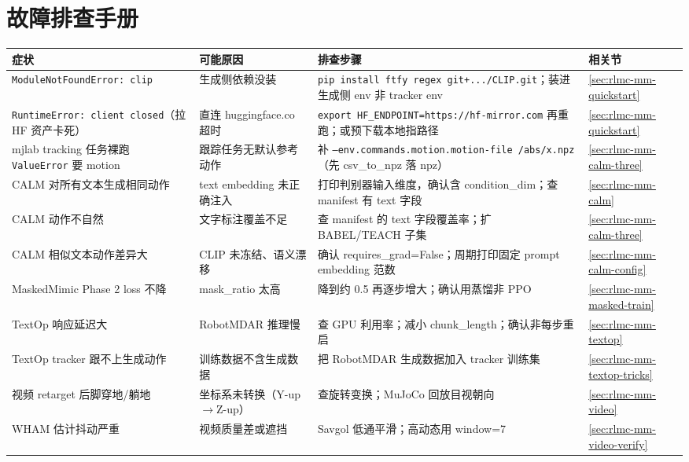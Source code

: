 \section*{故障排查手册}
\label{sec:rlmc-mm-troubleshoot}

\begin{center}
\small
\begin{tabular}{@{}p{3.4cm}p{3.0cm}p{4.4cm}l@{}}
\toprule
症状 & 可能原因 & 排查步骤 & 相关节 \\
\midrule
\texttt{ModuleNotFoundError: clip} & 生成侧依赖没装 & \texttt{pip install ftfy regex git+.../CLIP.git}；装进生成侧 env 非 tracker env & \cref{sec:rlmc-mm-quickstart} \\
\texttt{RuntimeError: client closed}（拉 HF 资产卡死） & 直连 huggingface.co 超时 & \texttt{export HF\_ENDPOINT=https://hf-mirror.com} 再重跑；或预下载本地指路径 & \cref{sec:rlmc-mm-quickstart} \\
mjlab tracking 任务裸跑 \texttt{ValueError} 要 motion & 跟踪任务无默认参考动作 & 补 \texttt{--env.commands.motion.motion-file /abs/x.npz}（先 csv\_to\_npz 落 npz） & \cref{sec:rlmc-mm-calm-three} \\
CALM 对所有文本生成相同动作 & text embedding 未正确注入 & 打印判别器输入维度，确认含 condition\_dim；查 manifest 有 text 字段 & \cref{sec:rlmc-mm-calm} \\
CALM 动作不自然 & 文字标注覆盖不足 & 查 manifest 的 text 字段覆盖率；扩 BABEL/TEACH 子集 & \cref{sec:rlmc-mm-calm-three} \\
CALM 相似文本动作差异大 & CLIP 未冻结、语义漂移 & 确认 requires\_grad=False；周期打印固定 prompt embedding 范数 & \cref{sec:rlmc-mm-calm-config} \\
MaskedMimic Phase 2 loss 不降 & mask\_ratio 太高 & 降到约 0.5 再逐步增大；确认用蒸馏非 PPO & \cref{sec:rlmc-mm-masked-train} \\
TextOp 响应延迟大 & RobotMDAR 推理慢 & 查 GPU 利用率；减小 chunk\_length；确认非每步重启 & \cref{sec:rlmc-mm-textop} \\
TextOp tracker 跟不上生成动作 & 训练数据不含生成数据 & 把 RobotMDAR 生成数据加入 tracker 训练集 & \cref{sec:rlmc-mm-textop-tricks} \\
视频 retarget 后脚穿地/躺地 & 坐标系未转换（Y-up$\to$Z-up） & 查旋转变换；MuJoCo 回放目视朝向 & \cref{sec:rlmc-mm-video} \\
WHAM 估计抖动严重 & 视频质量差或遮挡 & Savgol 低通平滑；高动态用 window=7 & \cref{sec:rlmc-mm-video-verify} \\

\end{tabular}
\end{center}
